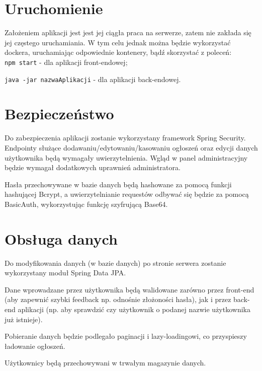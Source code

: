 \documentclass{article}
\begin{document}
\section{Uruchomienie}
{\fontsize{12}{12}\selectfont
    Założeniem aplikacji jest jest jej ciągła praca na serwerze, zatem nie zakłada się jej częstego uruchamiania. W tym celu jednak można będzie wykorzystać dockera, uruchamiając odpowiednie kontenery, bądź skorzystać z poleceń: \\
    
    \texttt{npm start} - dla aplikacji front-endowej;
    
    
    \texttt{java -jar nazwaAplikacji} - dla aplikacji back-endowej.
}


\section{Bezpieczeństwo}
{\fontsize{12}{12}\selectfont
    Do zabezpieczenia aplikacji zostanie wykorzystany framework Spring Security. Endpointy służące dodawaniu/edytowaniu/kasowaniu ogłoszeń oraz edycji danych użytkownika będą wymagały uwierzytelnienia. Wgląd w panel administracyjny będzie wymagał dodatkowych uprawnień administratora.
    
    Hasła przechowywane w bazie danych będą hashowane za pomocą funkcji hashującej Bcrypt, a uwierzytelnianie requestów odbywać się będzie za pomocą BasicAuth, wykorzystując funkcję szyfrującą Base64.

}


\section{Obsługa danych}
{\fontsize{12}{12}\selectfont
    Do modyfikowania danych (w bazie danych) po stronie serwera zostanie wykorzystany moduł Spring Data JPA. 
    
    Dane wprowadzane przez użytkownika będą walidowane zarówno przez front-end (aby zapewnić szybki feedback np. odnośnie złożoności hasła), jak i przez back-end aplikacji (np. aby sprawdzić czy użytkownik o podanej nazwie użytkownika już istnieje).
    
    Pobieranie danych będzie podlegało paginacji i lazy-loadingowi, co przyspieszy ładowanie ogłoszeń.
    
    Użytkownicy będą przechowywani w trwałym magazynie danych.

}
\end{document}
